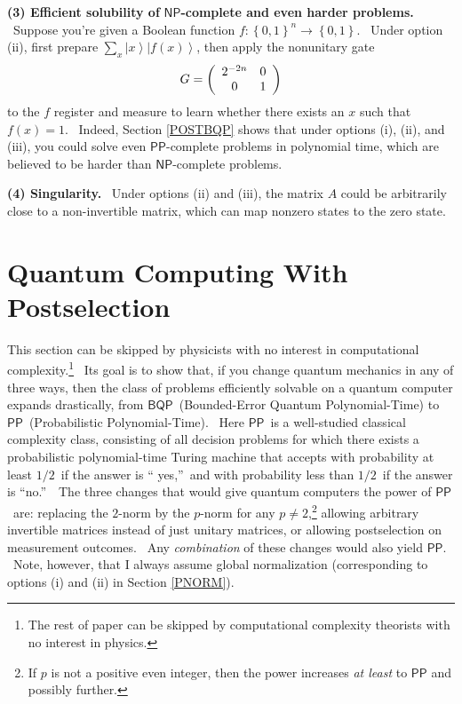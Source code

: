 \documentclass[12pt]{article}%
\begin{document}
\textbf{(3) Efficient solubility of }$\mathsf{NP}$\textbf{-complete and even
harder problems.} \ Suppose you're given a Boolean function $f:\left\{
0,1\right\}  ^{n}\rightarrow\left\{  0,1\right\}  $. \ Under option (ii),
first prepare $\sum_{x}\left\vert x\right\rangle \left\vert f\left(  x\right)
\right\rangle $, then apply the nonunitary gate%
\begin{equation}
G=\left(
\begin{array}
[c]{cc}%
2^{-2n} & 0\\
0 & 1
\end{array}
\right)  \label{gateg}%
\end{equation}
to the $f$ register and measure to learn whether there exists an $x$ such that
$f\left(  x\right)  =1$. \ Indeed, Section \ref{POSTBQP} shows that under
options (i), (ii), and (iii), you could solve even $\mathsf{PP}$-complete
problems in polynomial time, which are believed to be harder than
$\mathsf{NP}$-complete problems.

\textbf{(4) Singularity.} \ Under options (ii) and (iii), the matrix $A$ could
be arbitrarily close to a non-invertible matrix, which can map nonzero states
to the zero state.

\section{Quantum Computing With Postselection\label{POSTBQP}}

This section can be skipped by physicists with no interest in computational
complexity.\footnote{The rest of paper can be skipped by computational
complexity theorists with no interest in physics.} \ Its goal is to show that,
if you change quantum mechanics in any of three ways, then the class of
problems efficiently solvable on a quantum computer expands drastically, from
$\mathsf{BQP}$\ (Bounded-Error Quantum Polynomial-Time) to $\mathsf{PP}%
$\ (Probabilistic Polynomial-Time). \ Here $\mathsf{PP}$\ is a well-studied
classical complexity class, consisting of all decision problems for which
there exists a probabilistic polynomial-time Turing machine that accepts with
probability at least $1/2$\ if the answer is \textquotedblleft
yes,\textquotedblright\ and with probability less than $1/2$\ if the answer is
\textquotedblleft no.\textquotedblright\ \ The three changes that would give
quantum computers the power of $\mathsf{PP}$\ are: replacing the $2$-norm by
the $p$-norm for any $p\neq2$,\footnote{If $p$ is not a positive even integer,
then the power increases \textit{at least} to $\mathsf{PP}$ and possibly
further.} allowing arbitrary invertible matrices instead of just unitary
matrices, or allowing postselection on measurement outcomes. \ Any
\textit{combination} of these changes would also yield $\mathsf{PP}$. \ Note,
however, that I always assume global normalization (corresponding to options
(i) and (ii) in Section \ref{PNORM}).
\end{document}
